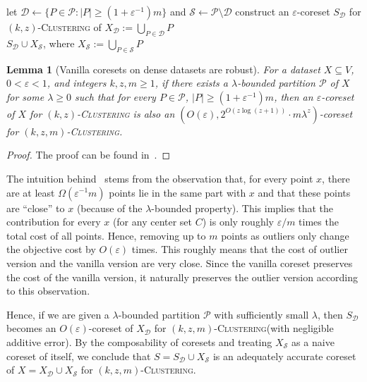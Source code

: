 \documentclass[letterpaper,11pt]{article}
\theoremstyle{plain}
\newtheorem{lemma}[theorem]{Lemma}
\theoremstyle{definition}
\theoremstyle{remark}
\newcommand{\eps}{\varepsilon}
\renewcommand{\epsilon}{\varepsilon}
\newcommand{\calD}{\mathcal{D}}
\newcommand{\calP}{\mathcal{P}}
\newcommand{\calS}{\mathcal{S}}
\newcommand{\ProblemName}[1]{\textsc{#1}}
\newcommand{\kzC}{\ProblemName{$(k,z)$-Clustering}\xspace}
\newcommand{\kzmC}{\ProblemName{$(k,z,m)$-Clustering}\xspace}
\begin{document}
\begin{algorithm}
    \caption{Coreset construction for \kzmC of $X$ based on bounded partition}
    \label{alg:construction based on bounded partition}
    \begin{algorithmic}[1]
        \Require{a $\lambda$-bounded partition $\calP$ of $X$}
        \State let $\calD\gets\{P\in\calP: |P|\ge (1+\eps^{-1})m\}$ and $\calS\gets \calP\setminus\calD$ \label{alg 1 line:decomposition}
        \State construct an $\eps$-coreset $S_{\calD}$ for \kzC of $X_{\calD}:=\bigcup_{P\in\calD} P$ \label{alg 1 line:coreset for dense subset}
        \\
        \Return $S_{\calD}\cup X_{\calS}$, where $X_{\calS}:=\bigcup_{P\in\calS} P$ 
    \end{algorithmic}
\end{algorithm}









\begin{lemma}[Vanilla coresets on dense datasets are robust]
    \label{thm:main1}
For a dataset $X\subseteq V$, $0<\eps<1$, and integers $k,z,m\ge 1$, if there exists a $\lambda$-bounded partition $\calP$ of $X$ for some $\lambda\ge 0$ such that for every $P\in\calP$, $|P|\ge (1+\eps^{-1})m$, then an $\eps$-coreset of $X$ for \kzC
    is also an $\left(O(\eps), 2^{O(z\log(z+1))}\cdot m\lambda^z \right)$-coreset for \kzmC.
\end{lemma}
\begin{proof}
    The proof can be found in~.
\end{proof}
The intuition behind~ stems from the observation that,
for every point $x$, there are at least $\Omega(\epsilon^{-1}m)$ points
lie in the same part with $x$ and that these points are ``close'' to $x$ (because of the $\lambda$-bounded property). This implies that the contribution for every $x$ (for any center set $C$) is only roughly $\epsilon / m$ times the total cost of all points.
Hence, removing up to $m$ points as outliers only change the objective cost 
by $O(\epsilon)$ times.
This roughly means that the cost of outlier version and the vanilla version are very close. Since the vanilla coreset preserves the cost of the vanilla version, it naturally preserves the outlier version according to this observation.

Hence, if we are given a $\lambda$-bounded partition $\calP$ with sufficiently small $\lambda$, then $S_{\calD}$ becomes an $O(\eps)$-coreset of $X_{\calD}$ for \kzmC (with negligible additive error). By the composability of coresets and treating $X_{\calS}$ as a naive coreset of itself, we conclude that $S = S_{\calD}\cup X_{\calS}$ is an adequately accurate coreset of $X = X_{\calD}\cup X_{\calS}$ for \kzmC.
\end{document}
